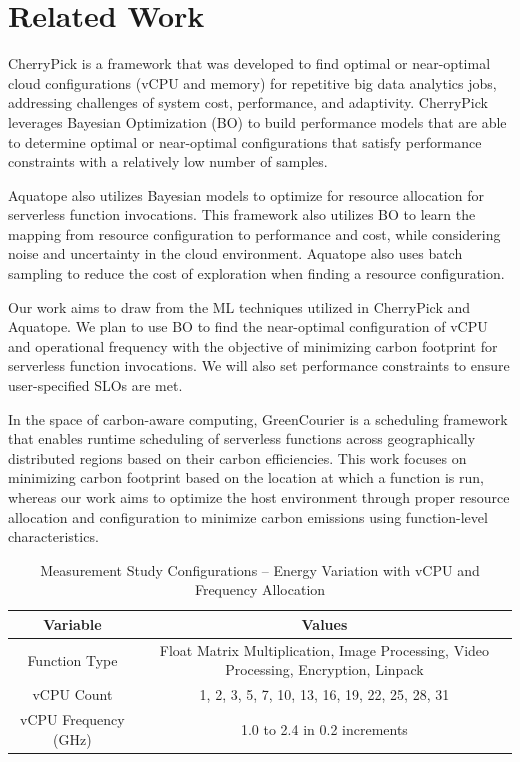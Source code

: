 \documentclass[times, 10pt,twocolumn]{article}
\begin{document}
\section{Related Work}
CherryPick \cite{CherryPick} is a framework that was developed to find optimal or near-optimal cloud configurations (vCPU and memory) for repetitive big data analytics jobs, addressing challenges of system cost, performance, and adaptivity. CherryPick leverages Bayesian Optimization (BO) to build performance models that are able to determine optimal or near-optimal configurations that satisfy performance constraints with a relatively low number of samples. 

Aquatope \cite{aquatope} also utilizes Bayesian models to optimize for resource allocation for serverless function invocations. This framework also utilizes BO to learn the mapping from resource configuration to performance and cost, while considering noise and uncertainty in the cloud environment. Aquatope also uses batch sampling to reduce the cost of exploration when finding a resource configuration.

Our work aims to draw from the ML techniques utilized in CherryPick and Aquatope. We plan to use BO to find the near-optimal configuration of vCPU and operational frequency with the objective of minimizing carbon footprint for serverless function invocations. We will also set performance constraints to ensure user-specified SLOs are met.

In the space of carbon-aware computing, GreenCourier \cite{GreenCourier} is a scheduling framework that enables runtime scheduling of serverless functions across geographically distributed regions based on their carbon efficiencies. This work focuses on minimizing carbon footprint based on the location at which a function is run, whereas our work aims to optimize the host environment through proper resource allocation and configuration to minimize carbon emissions using function-level characteristics.

\begin{table}[htbp]
   \centering
   \begin{tabular}{|c|c|}
   \hline
   \textbf{Variable} & \textbf{Values} \\ \hline
   Function Type & Float Matrix Multiplication, Image Processing, Video Processing, Encryption, Linpack \\ \hline
   vCPU Count & 1, 2, 3, 5, 7, 10, 13, 16, 19, 22, 25, 28, 31 \\ \hline
   vCPU Frequency (GHz) & 1.0 to 2.4 in 0.2 increments\\ \hline
   \end{tabular}
   \caption{Measurement Study Configurations -- Energy Variation with vCPU and Frequency Allocation}
   \label{tab:mstudy1_configurations}
\end{table}
\end{document}

